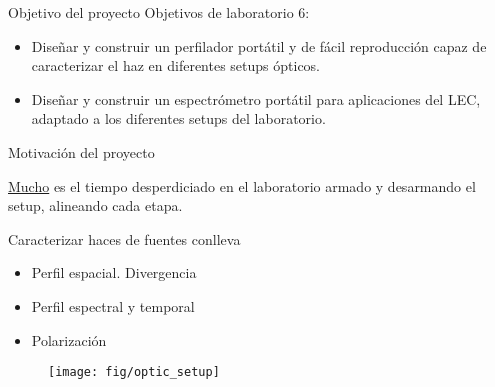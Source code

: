 \begin{frame}[t,plain]
\titlepage
\end{frame}

\begin{frame}{Objetivo del proyecto}
Objetivos de laboratorio 6:
\begin{itemize}
 \item Diseñar y construir un perfilador portátil y de fácil reproducción capaz de caracterizar el haz en diferentes setups ópticos.
 \item Diseñar y construir un espectrómetro portátil para aplicaciones del LEC, adaptado a los diferentes setups del laboratorio.
 \end{itemize}

\end{frame}


\begin{frame}[t]{Motivación del proyecto}


\begin{center}
\underline{Mucho} es el tiempo desperdiciado en el laboratorio armado y desarmando el setup, alineando cada etapa.
\end{center}

\begin{minipage}{0.5\textwidth}
Caracterizar haces de fuentes conlleva
\begin{itemize}
\item Perfil espacial. Divergencia
\item Perfil espectral y temporal
\item Polarización
\end{itemize}

\end{minipage}
%
\begin{minipage}{0.45\textwidth}
\begin{figure}[H]
\centering
\texttt{[image: fig/optic\_setup]}
\label{fig:optic_setup}
\end{figure}
\end{minipage}

\end{frame}


